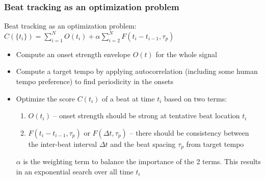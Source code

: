\documentclass{beamer}
\begin{document}

\begin{frame}
	\frametitle{Beat tracking as an optimization problem}
	Beat tracking as an optimization problem: $C(\{t_{i}\}) = \sum_{i=1}^{N}O(t_{i}) + \alpha\sum_{i=2}^{N}F(t_{i}-t_{i-1}, \tau_{p})$\\
	\vspace{1em}
	\begin{itemize}
		\item
			Compute an onset strength envelope $O(t)$ for the whole signal
		\item
			Compute a target tempo by applying autocorrelation (including some human tempo preference) to find periodicity in the onsets
		\item
			Optimize the score $C(t_{i})$ of a beat at time $t_{i}$ based on two terms:
			\begin{enumerate}
				\item
					$O(t_{i})$ -- onset strength should be strong at tentative beat location $t_{i}$
				\item
					$F(t_{i}-t_{i-1}, \tau_{p})$ or $F(\Delta t, \tau_{p})$ -- there should be consistency between the inter-beat interval $\Delta t$ and the beat spacing $\tau_{p}$ from target tempo
			\end{enumerate}
			$\alpha$ is the weighting term to balance the importance of the 2 terms. This results in an exponential search over all time $t_{i}$
	\end{itemize}
\end{frame}

\end{document}
